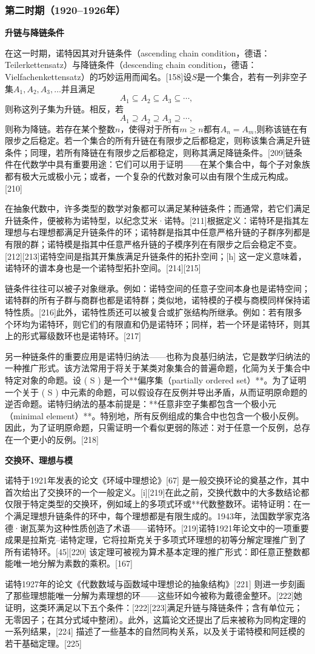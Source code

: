 \subsubsection{第二时期（1920–1926年）}
\textbf{升链与降链条件}

在这一时期，诺特因其对升链条件（ascending chain condition，德语：Teilerkettensatz）与降链条件（descending chain condition，德语：Vielfachenkettensatz）的巧妙运用而闻名。[158]设$S$是一个集合，若有一列非空子集$A_1, A_2, A_3, \ldots$并且满足
$$
A_1 \subseteq A_2 \subseteq A_3 \subseteq \cdots,~
$$
则称这列子集为升链。相反，若
$$
A_1 \supseteq A_2 \supseteq A_3 \supseteq \cdots,~
$$
则称为降链。若存在某个整数$n$，使得对于所有$m \ge n$都有$A_n = A_m$,则称该链在有限步之后稳定。若一个集合的所有升链在有限步之后都稳定，则称该集合满足升链条件；同理，若所有降链在有限步之后都稳定，则称其满足降链条件。[209]链条件在代数学中具有重要用途：它们可以用于证明——在某个集合中，每个子对象族都有极大元或极小元；或者，一个复杂的代数对象可以由有限个生成元构成。[210]

在抽象代数中，许多类型的数学对象都可以满足某种链条件；而通常，若它们满足升链条件，便被称为诺特型，以纪念艾米·诺特。[211]根据定义：诺特环是指其左理想与右理想都满足升链条件的环；诺特群是指其中任意严格升链的子群序列都是有限的群；诺特模是指其中任意严格升链的子模序列在有限步之后会稳定不变。[212][213]诺特空间是指其开集族满足升链条件的拓扑空间；[h] 这一定义意味着，诺特环的谱本身也是一个诺特型拓扑空间。[214][215]

链条件往往可以被子对象继承。例如：诺特空间的任意子空间本身也是诺特空间；诺特群的所有子群与商群也都是诺特群；类似地，诺特模的子模与商模同样保持诺特性质。[216]此外，诺特性质还可以被复合或扩张结构所继承。例如：若有限多个环均为诺特环，则它们的有限直和仍是诺特环；同样，若一个环是诺特环，则其上的形式幂级数环也是诺特环。[217]

另一种链条件的重要应用是诺特归纳法——也称为良基归纳法，它是数学归纳法的一种推广形式。该方法常用于将关于某类对象集合的普遍命题，化简为关于集合中特定对象的命题。设 ( S ) 是一个**偏序集（partially ordered set）**。为了证明一个关于 ( S ) 中元素的命题，可以假设存在反例并导出矛盾，从而证明原命题的逆否命题。诺特归纳法的基本前提是：**任意非空子集都包含一个极小元（minimal element）**。特别地，所有反例组成的集合中也包含一个极小反例。因此，为了证明原命题，只需证明一个看似更弱的陈述：对于任意一个反例，总存在一个更小的反例。[218]

\textbf{交换环、理想与模}

诺特于1921年发表的论文《环域中理想论》[67] 是一般交换环论的奠基之作，其中首次给出了交换环的一个一般定义。[i][219]在此之前，交换代数中的大多数结论都仅限于特定类型的交换环，例如域上的多项式环或**代数整数环。诺特证明：在一个满足理想升链条件的环中，每个理想都是有限生成的。1943年，法国数学家克洛德·谢瓦莱为这种性质创造了术语——诺特环。[219]诺特1921年论文中的一项重要成果是拉斯克–诺特定理，它将拉斯克关于多项式环理想的初等分解定理推广到了所有诺特环。[45][220] 该定理可被视为算术基本定理的推广形式：即任意正整数都能唯一地分解为素数的乘积。[167]

诺特1927年的论文《代数数域与函数域中理想论的抽象结构》[221] 则进一步刻画了那些理想能唯一分解为素理想的环——这些环如今被称为戴德金整环。[222]她证明，这类环满足以下五个条件：[222][223]满足升链与降链条件；含有单位元；无零因子；在其分式域中整闭）。此外，这篇论文还提出了后来被称为同构定理的一系列结果，[224] 描述了一些基本的自然同构关系，以及关于诺特模和阿廷模的若干基础定理。[225]

